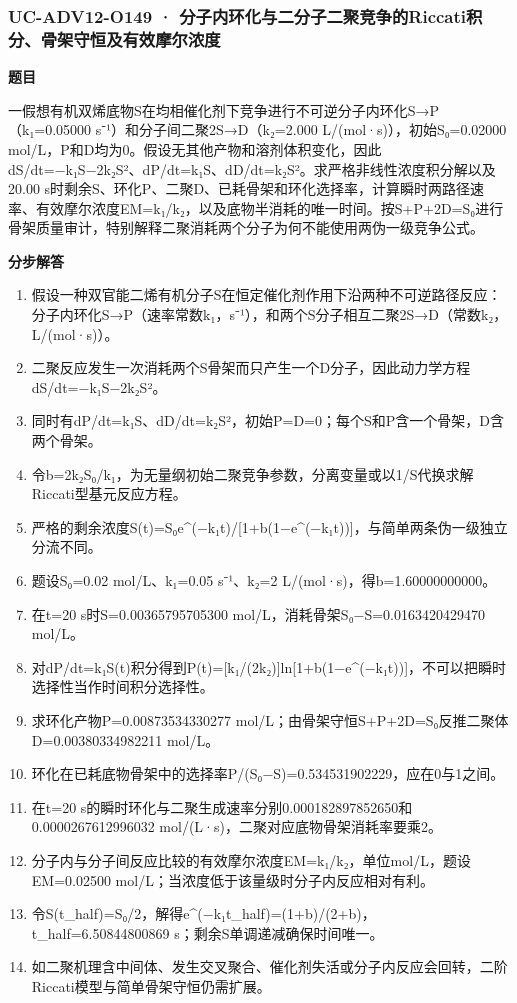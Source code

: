 \documentclass[UTF8,11pt,a4paper]{ctexart}
\begin{document}
\subsubsection*{UC-ADV12-O149 · 分子内环化与二分子二聚竞争的Riccati积分、骨架守恒及有效摩尔浓度}
\noindent\textbf{题目}\par
一假想有机双烯底物S在均相催化剂下竞争进行不可逆分子内环化S→P（k₁=0.05000 s⁻¹）和分子间二聚2S→D（k₂=2.000 L/(mol·s)），初始S₀=0.02000 mol/L，P和D均为0。假设无其他产物和溶剂体积变化，因此dS/dt=−k₁S−2k₂S²、dP/dt=k₁S、dD/dt=k₂S²。求严格非线性浓度积分解以及20.00 s时剩余S、环化P、二聚D、已耗骨架和环化选择率，计算瞬时两路径速率、有效摩尔浓度EM=k₁/k₂，以及底物半消耗的唯一时间。按S+P+2D=S₀进行骨架质量审计，特别解释二聚消耗两个分子为何不能使用两伪一级竞争公式。\par
\medskip\noindent\textbf{分步解答}
\begin{enumerate}
\item 假设一种双官能二烯有机分子S在恒定催化剂作用下沿两种不可逆路径反应：分子内环化S→P（速率常数k₁，s⁻¹），和两个S分子相互二聚2S→D（常数k₂，L/(mol·s)）。
\item 二聚反应发生一次消耗两个S骨架而只产生一个D分子，因此动力学方程dS/dt=−k₁S−2k₂S²。
\item 同时有dP/dt=k₁S、dD/dt=k₂S²，初始P=D=0；每个S和P含一个骨架，D含两个骨架。
\item 令b=2k₂S₀/k₁，为无量纲初始二聚竞争参数，分离变量或以1/S代换求解Riccati型基元反应方程。
\item 严格的剩余浓度S(t)=S₀e\textasciicircum{}(−k₁t)/[1+b(1−e\textasciicircum{}(−k₁t))]，与简单两条伪一级独立分流不同。
\item 题设S₀=0.02 mol/L、k₁=0.05 s⁻¹、k₂=2 L/(mol·s)，得b=1.60000000000。
\item 在t=20 s时S=0.00365795705300 mol/L，消耗骨架S₀−S=0.0163420429470 mol/L。
\item 对dP/dt=k₁S(t)积分得到P(t)=[k₁/(2k₂)]ln[1+b(1−e\textasciicircum{}(−k₁t))]，不可以把瞬时选择性当作时间积分选择性。
\item 求环化产物P=0.00873534330277 mol/L；由骨架守恒S+P+2D=S₀反推二聚体D=0.00380334982211 mol/L。
\item 环化在已耗底物骨架中的选择率P/(S₀−S)=0.534531902229，应在0与1之间。
\item 在t=20 s的瞬时环化与二聚生成速率分别0.000182897852650和0.0000267612996032 mol/(L·s)，二聚对应底物骨架消耗率要乘2。
\item 分子内与分子间反应比较的有效摩尔浓度EM=k₁/k₂，单位mol/L，题设EM=0.02500 mol/L；当浓度低于该量级时分子内反应相对有利。
\item 令S(t\_half)=S₀/2，解得e\textasciicircum{}(−k₁t\_half)=(1+b)/(2+b)，t\_half=6.50844800869 s；剩余S单调递减确保时间唯一。
\item 如二聚机理含中间体、发生交叉聚合、催化剂失活或分子内反应会回转，二阶Riccati模型与简单骨架守恒仍需扩展。
\end{enumerate}
\end{document}
